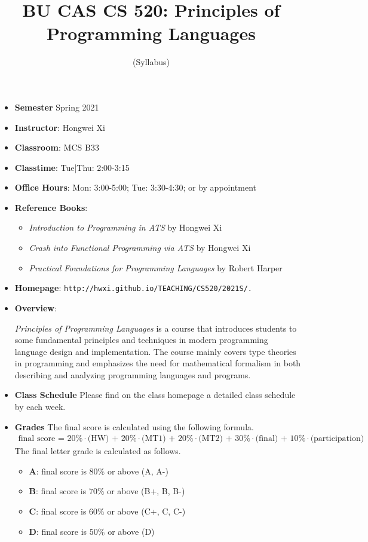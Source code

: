 \documentclass[11pt]{article}
\title{BU CAS CS 520: Principles of Programming Languages}
\author{(Syllabus)}
\date{}
\begin{document}
\maketitle
\thispagestyle{empty}

\begin{itemize}
\item {\bf Semester} Spring 2021
\item {\bf Instructor}: Hongwei Xi
\item {\bf Classroom}: MCS B33
\item {\bf Classtime}: Tue|Thu: 2:00-3:15
\item {\bf Office Hours}: Mon: 3:00-5:00; Tue: 3:30-4:30; or by appointment

\item {\bf Reference Books}:\kern6pt
\begin{itemize}
\item
{\em Introduction to Programming in ATS} by Hongwei Xi
\item
{\em Crash into Functional Programming via ATS} by Hongwei Xi
\item
{\em Practical Foundations for Programming Languages} by Robert Harper
\end{itemize}

\item {\bf Homepage}: {\tt http://hwxi.github.io/TEACHING/CS520/2021S/.}

\item {\bf Overview}:

{\em Principles of Programming Languages} is a course
that introduces students to some fundamental principles and techniques in
modern programming language design and implementation. The course mainly
covers type theories in programming and emphasizes the need for
mathematical formalism in both describing and analyzing programming
languages and programs.

\item {\bf Class Schedule}
Please find on the class homepage a detailed class schedule by each week.

\item {\bf Grades}
The final score is calculated using the following formula.
\[\begin{array}{l}
\mbox{final score = 20\%$\cdot$(HW) + 20\%$\cdot$(MT1) + 20\%$\cdot$(MT2) + 30\%$\cdot$(final) + 10\%$\cdot$(participation)}
\end{array}\]
The final letter grade is calculated as follows.
\begin{itemize}
\item{\bf A}: final score is $80\%$ or above (A, A-)
\item{\bf B}: final score is $70\%$ or above (B+, B, B-)
\item{\bf C}: final score is $60\%$ or above (C+, C, C-)
\item{\bf D}: final score is $50\%$ or above (D)
\end{itemize}


\end{itemize}
\end{document}

